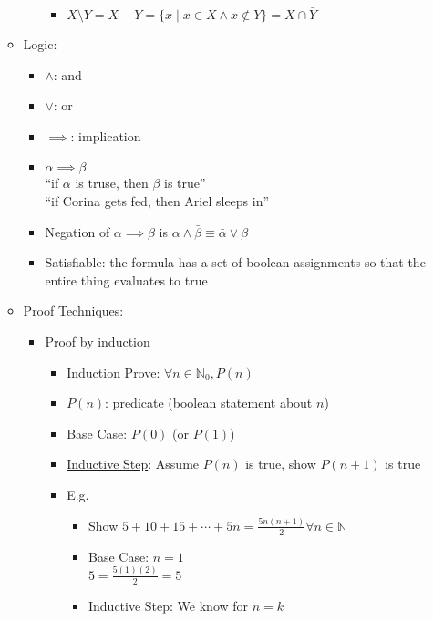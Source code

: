 \documentclass[12pt]{article}
\begin{document}
\begin{enumerate}
\begin{itemize}
\begin{itemize}
\begin{itemize}
                    \item $X \setminus Y = X - Y = \{x \mid x \in X \land x \notin Y\} = X \cap \bar{Y}$
                \end{itemize}
            \end{itemize}
            \item Logic:
            \begin{itemize}
                \item $\land$: and
                \item $\lor$: or
                \item $\implies$: implication
                \item $\alpha \implies \beta$ \\
                ``if $\alpha$ is truse, then $\beta$ is true'' \\
                ``if Corina gets fed, then Ariel sleeps in''
                \item Negation of $\alpha \implies \beta$ is $\alpha \land \bar{\beta} \equiv \bar{\alpha} \lor \beta$
                \item Satisfiable: the formula has a set of boolean assignments so that the entire thing evaluates to true
            \end{itemize}
            \item Proof Techniques:
            \begin{itemize}
                \item Proof by induction
                \begin{itemize}
                    \item Induction Prove: $\forall n \in \mathbb{N}_0, P(n)$
                    \item $P(n)$: predicate (boolean statement about $n$)
                    \item \underline{Base Case}: $P(0)$ (or $P(1)$)
                    \item \underline{Inductive Step}: Assume $P(n)$ is true, show $P(n+1)$ is true
                    \item E.g.
                    \begin{itemize}
                        \item Show $5+10+15+\cdots+5n = \frac{5n(n+1)}{2} \forall n \in \mathbb{N}$
                        \item Base Case: $n=1$ \\
                        $5 = \frac{5(1)(2)}{2} = 5$
                        \item Inductive Step: We know for $n = k$ \\

\end{itemize}
\end{itemize}
\end{itemize}
\end{itemize}
\end{enumerate}
\end{document}

